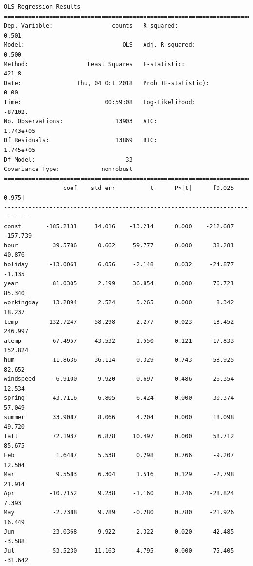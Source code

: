 \documentclass[11pt]{article}
\begin{document}
    \begin{Verbatim}[commandchars=\\\{\}]
                            OLS Regression Results                            
==============================================================================
Dep. Variable:                 counts   R-squared:                       0.501
Model:                            OLS   Adj. R-squared:                  0.500
Method:                 Least Squares   F-statistic:                     421.8
Date:                Thu, 04 Oct 2018   Prob (F-statistic):               0.00
Time:                        00:59:08   Log-Likelihood:                -87102.
No. Observations:               13903   AIC:                         1.743e+05
Df Residuals:                   13869   BIC:                         1.745e+05
Df Model:                          33                                         
Covariance Type:            nonrobust                                         
==============================================================================
                 coef    std err          t      P>|t|      [0.025      0.975]
------------------------------------------------------------------------------
const       -185.2131     14.016    -13.214      0.000    -212.687    -157.739
hour          39.5786      0.662     59.777      0.000      38.281      40.876
holiday      -13.0061      6.056     -2.148      0.032     -24.877      -1.135
year          81.0305      2.199     36.854      0.000      76.721      85.340
workingday    13.2894      2.524      5.265      0.000       8.342      18.237
temp         132.7247     58.298      2.277      0.023      18.452     246.997
atemp         67.4957     43.532      1.550      0.121     -17.833     152.824
hum           11.8636     36.114      0.329      0.743     -58.925      82.652
windspeed     -6.9100      9.920     -0.697      0.486     -26.354      12.534
spring        43.7116      6.805      6.424      0.000      30.374      57.049
summer        33.9087      8.066      4.204      0.000      18.098      49.720
fall          72.1937      6.878     10.497      0.000      58.712      85.675
Feb            1.6487      5.538      0.298      0.766      -9.207      12.504
Mar            9.5583      6.304      1.516      0.129      -2.798      21.914
Apr          -10.7152      9.238     -1.160      0.246     -28.824       7.393
May           -2.7388      9.789     -0.280      0.780     -21.926      16.449
Jun          -23.0368      9.922     -2.322      0.020     -42.485      -3.588
Jul          -53.5230     11.163     -4.795      0.000     -75.405     -31.642

\end{Verbatim}
\end{document}
